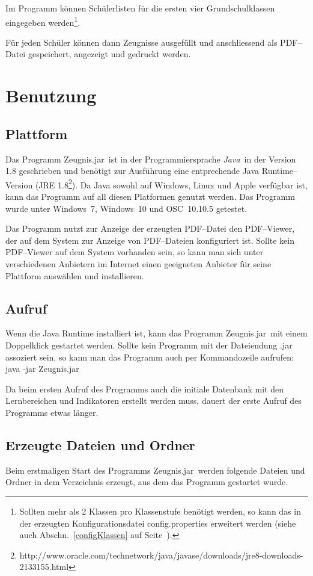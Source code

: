 \documentclass[a4paper,notitlepage,parskip]{scrartcl}
\newcommand{\zjar}{Zeugnis.jar}
\newcommand\ott{\normalfont\ttfamily}
\newcommand\java{{\normalfont\slshape Java}}
\begin{document}
Im Programm können Schülerlisten für die ersten vier Grundschulklassen eingegeben
werden\footnote{Sollten mehr als 2 Klassen pro Klassenstufe benötigt werden, so kann das in der erzeugten Konfigurationsdatei {\ott config.properties} erweitert werden (siehe auch Abschn.~\ref{configKlassen} auf Seite~\pageref{configKlassen}).}.

Für jeden Schüler können dann Zeugnisse ausgefüllt und anschliessend als PDF--Datei gespeichert, angezeigt und gedruckt werden.

\section{Benutzung}
\subsection{Plattform}
Das Programm \zjar\ ist in der Programmiersprache \java\ in der Version 1.8 geschrieben und benötigt zur Ausführung eine entprechende Java Runtime--Version 
(JRE 1.8\footnote{http://www.oracle.com/technetwork/java/javase/downloads/jre8-downloads-2133155.html}).
Da Java sowohl auf Windows, Linux und Apple verfügbar ist, kann das Programm auf all diesen Platformen genutzt werden. Das Programm wurde unter Windows~7, Windows~10 und OSC~10.10.5 getestet.

Das Programm nutzt zur Anzeige der erzeugten PDF--Datei den PDF--Viewer, der auf dem System zur Anzeige von PDF--Dateien konfiguriert ist. Sollte kein PDF--Viewer auf dem System vorhanden sein, so kann man sich unter verschiedenen Anbietern im Internet einen geeigneten Anbieter für seine Plattform auswählen und installieren.

\subsection{Aufruf}
Wenn die Java Runtime installiert ist, kann das Programm \zjar\ mit einem Doppelklick gestartet werden. Sollte kein Programm mit der Dateiendung {\ott .jar} assoziert sein, so kann man das Programm auch per Kommandozeile aufrufen:\\
{\ott java -jar Zeugnis.jar}

Da beim ersten Aufruf des Programms auch die initiale Datenbank mit den Lernbereichen und Indikatoren erstellt werden muss, dauert der erste Aufruf des Programms etwas länger.

\subsection{Erzeugte Dateien und Ordner}
Beim erstmaligen Start des Programms \zjar\ werden folgende Dateien und Ordner in dem Verzeichnis erzeugt, aus dem das Programm gestartet wurde.
\end{document}
